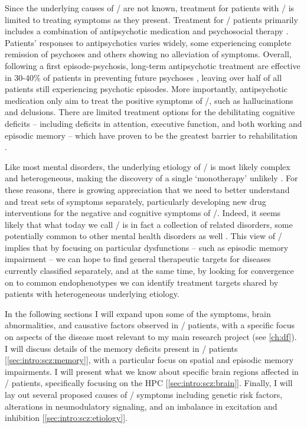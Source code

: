 Since the underlying causes of \scz/ are not known, treatment for patients with \scz/ is limited to treating symptoms as they present.
Treatment for \scz/ patients primarily includes a combination of antipsychotic medication and psychosocial therapy \citep{NIMHa}.
Patients' responses to antipsychotics varies widely, some experiencing complete remission of psychoses and others showing no alleviation of symptoms.
Overall, following a first episode-psychosis, long-term antipsychotic treatment are effective in 30-40\% of patients in preventing future psychoses \citep{Boyer2007, Insel2010}, leaving over half of all patients still experiencing psychotic episodes.
More importantly, antipsychotic medication only aim to treat the positive symptoms of \scz/, such as hallucinations and delusions.
There are limited treatment options for the debilitating cognitive deficits -- including deficits in attention, executive function, and both working and episodic memory -- which have proven to be the greatest barrier to rehabilitation \citep{Lieberman2005, Harrison2001, O'Carroll2000, Hyman2003}.

Like most mental disorders, the underlying etiology of \scz/ is most likely complex and heterogeneous, making the discovery of a single `monotherapy' unlikely \citep{Hyman2003}.
For these reasons, there is growing appreciation that we need to better understand and treat sets of symptoms separately, particularly developing new drug interventions for the negative and cognitive symptoms of \scz/.
Indeed, it seems likely that what today we call \scz/ is in fact a collection of related disorders, some potentially common to other mental health disorders as well \citep{Insel2010}.
This view of \scz/ implies that by focusing on particular dysfunctions -- such as episodic memory impairment -- we can hope to find general therapeutic targets for diseases currently classified separately, and at the same time, by looking for convergence on to common endophenotypes we can identify treatment targets shared by patients with heterogeneous underlying etiology.

In the following sections I will expand upon some of the symptoms, brain abnormalities, and causative factors observed in \scz/ patients, with a specific focus on aspects of the disease most relevant to my main research project (see \autoref{ch:df}).
I will discuss details of the memory deficits present in \scz/ patients [\ref{sec:intro:scz:memory}], with a particular focus on spatial and episodic memory impairments.
I will present what we know about specific brain regions affected in \scz/ patients, specifically focusing on the \ac{HPC} [\ref{sec:intro:scz:brain}].
Finally, I will lay out several proposed causes of \scz/ symptoms including genetic risk factors, alterations in neumodulatory signaling, and an imbalance in excitation and inhibition [\ref{sec:intro:scz:etiology}].

